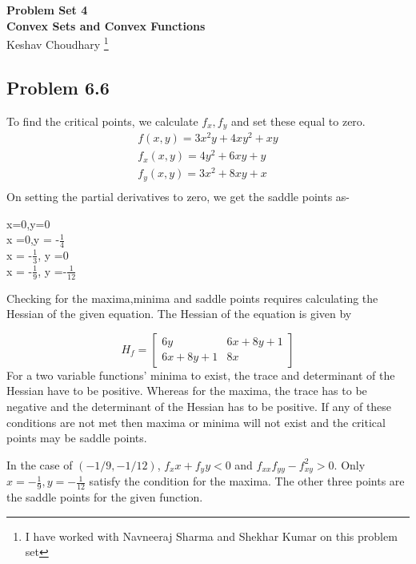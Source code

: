 \documentclass[letterpaper,12pt]{article}
\theoremstyle{definition}
\begin{document}
\begin{flushleft}
\textbf{\large{Problem Set 4}} \\
\vspace{2mm}
\textbf{\large{Convex Sets and Convex Functions}} \\
\vspace{2mm}
Keshav Choudhary \footnote{I have worked with Navneeraj Sharma and Shekhar Kumar on this problem set} \\
\end{flushleft}

\vspace{2mm}


\subsection*{Problem 6.6}
To find the critical points, we calculate $f_x, f_y$ and set these equal to zero.
\begin{align*}
  f(x,y) = 3x^2y + 4xy^2 + xy \\ 
  f_x(x,y) = 4y^2 + 6xy + y\\
  f_y(x,y) = 3x^2 + 8xy + x\\
\end{align*}
On setting the partial derivatives to zero, we get the saddle points as- 
\begin{center}
x=0,y=0\\
\vspace{1mm}
x =0,y = -$\frac{1}{4}$\\
\vspace{1mm}
x = -$\frac{1}{3}$, y =0\\
\vspace{1mm}
x = -$\frac{1}{9}$, y =-$\frac{1}{12}$
\end{center}
\begin{flushleft}
Checking for the maxima,minima and saddle points requires calculating the Hessian of the given equation. The Hessian of the equation is given by 
\end{flushleft}
\begin{equation*}
H_{f} = \begin{bmatrix} 6y & 6x+8y+1\\6x+8y+1 & 8x \end{bmatrix}
\end{equation*}
For a two variable functions' minima to exist, the trace and determinant of the Hessian have to be positive. Whereas for the maxima, the trace has to be negative and the determinant of the Hessian has to be positive. If any of these conditions are not met then maxima or minima will not exist and the critical points may be saddle points.\\
\begin{flushleft}
In the case of $(-1/9, -1/12)$, $f_xx + f_yy < 0$ and $f_{xx} f_{yy} - f_{xy}^2 > 0.$ Only $x =  -\frac{1}{9}, y =-\frac{1}{12}$ satisfy the condition for the maxima. The other three points are the saddle points for the given function.
\end{flushleft}
\end{document}
